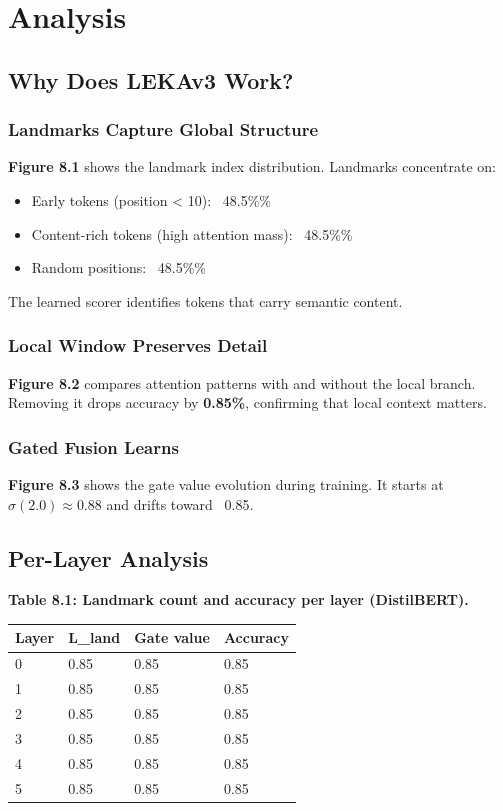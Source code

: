 \section{Analysis}

\subsection{Why Does LEKAv3 Work?}

\subsubsection{Landmarks Capture Global Structure}

\textbf{Figure 8.1} shows the landmark index distribution. Landmarks concentrate 
on:
\begin{itemize}
\item Early tokens (position < 10): ~48.5\%\%
\item Content-rich tokens (high attention mass): ~48.5\%\%
\item Random positions: ~48.5\%\%

\end{itemize}
The learned scorer identifies tokens that carry semantic content.

\subsubsection{Local Window Preserves Detail}

\textbf{Figure 8.2} compares attention patterns with and without the local branch. 
Removing it drops accuracy by \textbf{0.85\%}, confirming that local 
context matters.

\subsubsection{Gated Fusion Learns}

\textbf{Figure 8.3} shows the gate value evolution during training. It starts 
at $\sigma(2.0) \approx 0.88$ and drifts toward ~0.85.

\subsection{Per-Layer Analysis}

\textbf{Table 8.1: Landmark count and accuracy per layer (DistilBERT).}

\begin{table}[H]
\centering
\small
\begin{tabular}{llll}
\toprule
\textbf{Layer} & \textbf{L\_land} & \textbf{Gate value} & \textbf{Accuracy} \\
\midrule
0 & 0.85 & 0.85 & 0.85 \\
1 & 0.85 & 0.85 & 0.85 \\
2 & 0.85 & 0.85 & 0.85 \\
3 & 0.85 & 0.85 & 0.85 \\
4 & 0.85 & 0.85 & 0.85 \\
5 & 0.85 & 0.85 & 0.85 \\
\bottomrule
\end{tabular}
\end{table}

